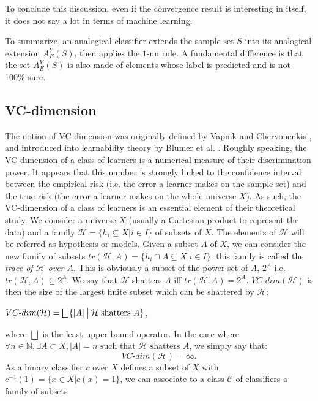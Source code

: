 \begin{enumerate}
\end{enumerate}
To conclude this discussion, even if the convergence result is interesting in
itself, it does not say a lot in terms of machine learning.

To summarize, an analogical classifier extends the sample set $S$ into its
analogical extension $A_E^Y(S)$, then applies the $1\mbox{-nn}$ rule. A
fundamental difference is that the set $A_E^Y(S)$ is also made of elements
whose label is predicted and is not 100\% sure.

\subsection{VC-dimension}\label{vcdim}
The notion of VC-dimension was originally defined by Vapnik and Chervonenkis
\cite{Vap98}, and introduced into learnability theory by Blumer et al.
\cite{BluEhrHauWarACM89}. Roughly speaking, the VC-dimension of a class of learners is a numerical measure of their discrimination power. It appears that this number is strongly linked to the confidence interval between the empirical risk (i.e. the error a learner makes on the sample set) and the true risk (the error a learner makes on the whole universe $X$). As such, the VC-dimension of a class of learners is an essential element of their theoretical study.
We consider a universe $X$ (usually a Cartesian product to represent the data) and a
family $\mathcal{H}=\{h_i \subseteq X|i \in I\}$ of subsets of $X$.
The elements of $\mathcal{H}$ will be referred as hypothesis or models.
Given a subset $A$
of $X$, we can consider the new family of subsets $tr(\mathcal{H},A) = \{h_i \cap A \subseteq X|i \in I\}$: this family is called the {\it trace of $\mathcal{H}$ over $A$}. This is obviously a subset
of the power set of $A$, $2^A$ i.e. $tr(\mathcal{H},A) \subseteq 2^A$.
We say that $\mathcal{H}$ shatters $A$ iff $tr(\mathcal{H},A)=2^A$.
$VC\mbox{-}dim(\mathcal{H})$ is then the size of the largest finite subset which can be shattered by $\mathcal{H}$:
\begin{definition}
  $VC\mbox{-}dim(\mathcal{H}) = \bigsqcup \{|A| \given[\big] \mathcal{H} \mbox{ shatters } A
\}$,
\end{definition}
where $\bigsqcup$ is the least upper bound operator.
In the case where $\forall n \in\mathbb{N}, \exists  A \subset X, |A|=n \mbox{ such
that } \mathcal{H} \mbox{ shatters } A$, we simply say that:
$$VC\mbox{-}dim(\mathcal{H})=\infty.$$
\noindent
As a binary classifier $c$ over $X$ defines a subset of $X$ with $c^{-1}(1)=\{x \in X | c(x)=1\}$, we can associate to a class $\mathcal{C}$ of classifiers a family of subsets
